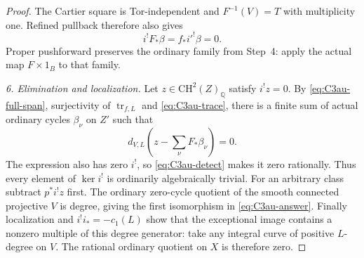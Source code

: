 \begin{proof}
The Cartier square is Tor-independent and $F^{-1}(V)=T$
with multiplicity one. Refined pullback therefore also gives
\[
                   i^!F_*\beta=f_*i'^!\beta=0.
\]
Proper pushforward preserves the ordinary family from Step~4:
apply the actual map $F\times1_B$ to that family.

\emph{6. Elimination and localization.}
Let $z\in\mathrm{CH}^2(Z)_{\mathbb Q}$ satisfy $i^!z=0$.
By \eqref{eq:C3au-full-span}, surjectivity of
$\operatorname{tr}_{f,L}$ and \eqref{eq:C3au-trace}, there is
a finite sum of actual ordinary cycles $\beta_\nu$ on $Z'$
such that
\[
          d_{V,L}\left(z-\sum_\nu F_*\beta_\nu\right)=0.
\]
The expression also has zero $i^!$, so
\eqref{eq:C3au-detect} makes it zero rationally. Thus every
element of $\ker i^!$ is ordinarily algebraically trivial.
For an arbitrary class subtract $p^*i^!z$ first.
The ordinary zero-cycle quotient of the smooth connected
projective $V$ is degree, giving the first isomorphism in
\eqref{eq:C3au-answer}. Finally localization and
$i^!i_*=-c_1(L)$ show that the exceptional image contains
a nonzero multiple of this degree generator: take any
integral curve of positive $L$-degree on $V$.
The rational ordinary quotient on $X$ is therefore zero.
\end{proof}
